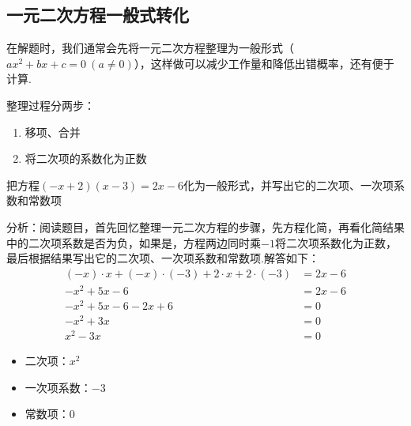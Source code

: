 \documentclass[lang=cn, 10pt, titlestyle=hang, oneside]{elegantbook}
\begin{document}
\subsection{一元二次方程一般式转化}

在解题时，我们通常会先将一元二次方程整理为一般形式（$
ax^2 + bx + c = 0 \ (a \neq 0)
$），这样做可以减少工作量和降低出错概率，还有便于计算.
\par




整理过程分两步：
\begin{enumerate}
    \item 移项、合并
    \item 将二次项的系数化为正数
\end{enumerate}
\begin{example}
    把方程\((-x+2)(x-3)=2x-6\)化为一般形式，并写出它的二次项、一次项系数和常数项
\end{example}
\par
\begin{solution}
    分析：阅读题目，首先回忆整理一元二次方程的步骤，先方程化简，再看化简结果中的二次项系数是否为负，如果是，方程两边同时乘\(-1\)将二次项系数化为正数，最后根据结果写出它的二次项、一次项系数和常数项.解答如下：
    \begin{align*}
    (-x) \cdot x + (-x) \cdot (-3) + 2 \cdot x + 2 \cdot (-3)&=2x-6 \\
        -x^2 + 5x - 6 &= 2x - 6 \\
        -x^2 + 5x - 6 - 2x + 6 &= 0 \\
        -x^2 + 3x &= 0\\
         x^2 - 3x &= 0%
    \end{align*}
    \begin{itemize}[label=]
        \item 二次项：$x^2$
        \item 一次项系数：$-3$
        \item 常数项：$0$
    \end{itemize}
\end{solution}
\end{document}
